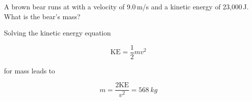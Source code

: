 \documentclass[answers]{exam}
\begin{document}
\begin{questions}







\question %
A brown bear runs at with a velocity of 9.0\,m/s and a kinetic energy of 23,000\,J. What is the bear’s mass?

\begin{solution}
Solving the kinetic energy equation

\begin{equation*}
    \mathrm{KE} = \frac{1}{2} mv^2
\end{equation*}

for mass leads to

\begin{equation*}
    m = \frac{2\mathrm{KE}}{v^2} = \boxed{\SI{568}{kg}}
\end{equation*}
\end{solution}







\end{questions}
\end{document}
